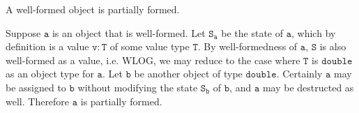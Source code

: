 \begin{Lemma}
    A well-formed object is partially formed.
\end{Lemma}

\begin{solution}
    Suppose $\mathtt{a}$ is an object that is well-formed. Let $\mathtt{S_{a}}$ 
    be the state of $\mathtt{a}$, which by definition is a value $\mathtt{v : T}$ of 
    some value type $\mathtt{T}$. By well-formedness of $\mathtt{a}$, $\mathtt{S}$ is 
    also well-formed as a value, i.e. WLOG, we may reduce to the case where 
    $\mathtt{T}$ is $\mathtt{double}$ as an object type for $\mathtt{a}$. Let $\mathtt{b}$ 
    be another object of type $\mathtt{double}$. Certainly $\mathtt{a}$ may be assigned to 
    $\mathtt{b}$ without modifying the state $\mathtt{S_{b}}$ of $\mathtt{b}$, and 
    $\mathtt{a}$ may be destructed as well. Therefore $\mathtt{a}$ is partially formed.
\end{solution}